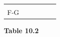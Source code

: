 {{\begin{center}
\begin{tabular}[t]{|l|l|l|l|l|l|}
         &
         &
         &
         &
     \tabularnewline\cline{1-1}\cline{2-2}\cline{3-3}\cline{4-4}\cline{5-5}\cline{6-6}
        F-G &
         &
         &
         &
         &
     \tabularnewline\cline{1-1}\cline{2-2}\cline{3-3}\cline{4-4}\cline{5-5}\cline{6-6}
    \end{tabular}
      \end{center}
    \begin{center}{\small\bfseries Table 10.2}\end{center}
}}
